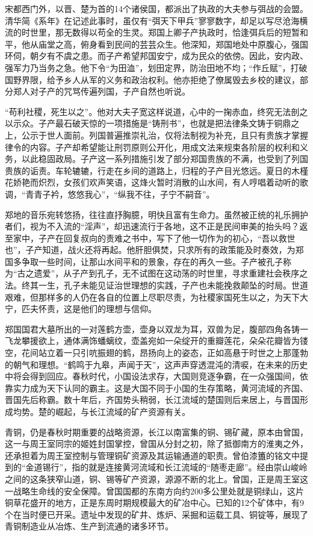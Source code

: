 宋都西门外，以晋、楚为首的14个诸侯国，都派出了执政的大夫参与弭战的会盟。清华简《系年》在记述此事时，虽仅有“弭天下甲兵”寥寥数字，却足以写尽沧海横流的时世里，那无数得以苟全的生灵。郑国上卿子产执政时，恰逢弭兵后的短暂和平，他从庙堂之高，俯身看到民间的芸芸众生。他深知，郑国地处中原腹心，强国环伺，朝夕有不虞之患。而子产希望邦国安宁，成为民众的依傍。因此，安内政、强军力乃当务之急。他下令“为田洫”，划田定界，防治田地不均；“作丘赋”，打破国野界限，给予乡人从军的义务和政治权利。他亦拒绝了僚属毁去乡校的建议，部分郑人对子产的咒骂传遍列国，子产自然也听说。

“苟利社稷，死生以之”。他对大夫子宽这样说道，心中的一掬赤血，终究无法剖之以示众。子产最石破天惊的一项措施是“铸刑书”，也就是把法律条文铸于铜鼎之上，公示于世人面前。列国普遍推崇礼治，仅将法制视为补充，且只有贵族才掌握律令的内容。子产却希望能让刑罚原则公开化，用成文法来规束各阶层的权利和义务，以此稳固政局。子产这一系列措施引发了部分郑国贵族的不满，也受到了列国贵族的诟责。车轮辘辘，行走在乡间的道路上，归程的子产目光悠远。夏日的木槿花娇艳而炽烈，女孩们欢声笑语，这烽火暂时消散的山水间，有人哼唱着动听的歌调，“青青子衿，悠悠我心”，“纵我不往，子宁不嗣音”。

郑地的音乐宛转悠扬，往往直抒胸臆，明快且富有生命力。虽然被正统的礼乐拥护者们，视为不入流的“淫声”，却迅速流行于各地，这不正是民间审美的抬头吗？返至家中，子产在回复叔向的责难之书中，写下了他一切作为的初心，“吾以救世也”，子产知道，战火还将再起。他肝胆俱焚，只求所有的政策能及时奏效，为郑国多争取一些时间，让那山水间平和的景象，存在的再久一些。子产被孔子称为“古之遗爱”，从子产到孔子，无不试图在这动荡的时世里，寻求重建社会秩序之法。终其一生，孔子未能见证治世理想的实践，子产也未能挽救颠坠的时局。世道艰难，但那样多的人仍在各自的位置上尽职尽责，为社稷家国死生以之，为天下大宁，匹夫怀责，这是他们的理想与信仰。

郑国国君大墓所出的一对莲鹤方壶，壶身以双龙为耳，双兽为足，腹部四角各铸一飞龙攀援欲上，通体满饰蟠螭纹，壶盖宛如一朵绽开的重瓣莲花，朵朵花瓣皆为镂空，花间站立着一只引吭振翅的鹤，昂扬向上的姿态，正如高悬于时世之上那蓬勃的朝气和理想。“鹤鸣于九皋，声闻于天”，这声声穿透混沌的清唳，在未来的历史中将会得到回应。春秋时代，小国设法求存，大国则竞逐争霸，在一众强国间，依靠实力成为天下认同的霸主。这是大国不同于小国的生存策略，黄河流域的齐国、晋国先后称霸。数十年后，齐国势头稍弱，长江流域的楚国则后来居上，与晋国形成均势。楚的崛起，与长江流域的矿产资源有关。

青铜，仍是春秋时期重要的战略资源，长江以南富集的铜、锡矿藏，原本由曾国，这一与周王室同宗的姬姓封国掌控，曾国从分封之初，除了抵御南方的淮夷之外，还承担着为周王室控制与管理铜矿资源及其运输通道的职责。曾伯漆簠的铭文中提到的“金道锡行”，指的就是连接黄河流域和长江流域的“随枣走廊”。经由崇山峻岭之间的这条狭窄山道，铜、锡等矿产资源，源源不断的北上。曾国，正是周王室这一战略生命线的安全保障。曾国国都的东南方向约200多公里处就是铜绿山，这片铜草花盛开的地方，正是东周时期规模最大的矿冶中心。已知的12个矿体中，有9个在当时便已开采。遗址中发现的矿井、炼炉、采掘和运载工具、铜锭等，展现了青铜制造业从冶炼、生产到流通的诸多环节。

